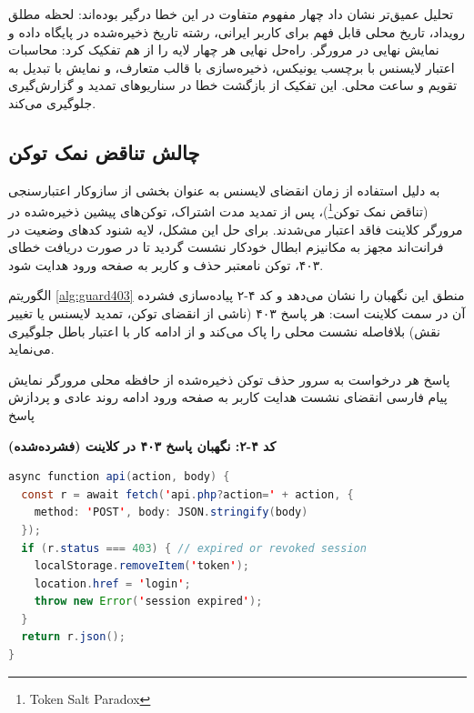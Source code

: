 \documentclass[11pt, a4paper]{report}
\newcommand{\enfootnote}[1]{\footnote{\foreignlanguage{english}{#1}}}
\begin{document}
تحلیل عمیق‌تر نشان داد چهار مفهوم متفاوت در این خطا درگیر بوده‌اند: لحظه مطلق رویداد، تاریخ محلی قابل فهم برای کاربر ایرانی، رشته تاریخ ذخیره‌شده در پایگاه داده و نمایش نهایی در مرورگر. راه‌حل نهایی هر چهار لایه را از هم تفکیک کرد: محاسبات اعتبار لایسنس با برچسب یونیکس، ذخیره‌سازی با قالب متعارف، و نمایش با تبدیل به تقویم و ساعت محلی. این تفکیک از بازگشت خطا در سناریوهای تمدید و گزارش‌گیری جلوگیری می‌کند.

\subsection{چالش تناقض نمک توکن}
به دلیل استفاده از زمان انقضای لایسنس به عنوان بخشی از سازوکار اعتبارسنجی (تناقض نمک توکن\enfootnote{Token Salt Paradox})، پس از تمدید مدت اشتراک، توکن‌های پیشین ذخیره‌شده در مرورگر کلاینت فاقد اعتبار می‌شدند. برای حل این مشکل، لایه شنود کدهای وضعیت در فرانت‌اند مجهز به مکانیزم ابطال خودکار نشست گردید تا در صورت دریافت خطای ۴۰۳، توکن نامعتبر حذف و کاربر به صفحه ورود هدایت شود.

الگوریتم \ref{alg:guard403} منطق این نگهبان را نشان می‌دهد و کد ۴-۲ پیاده‌سازی فشرده آن در سمت کلاینت است: هر پاسخ ۴۰۳ (ناشی از انقضای توکن، تمدید لایسنس یا تغییر نقش) بلافاصله نشست محلی را پاک می‌کند و از ادامه کار با اعتبار باطل جلوگیری می‌نماید.

\begin{algorithm}[htbp]
\caption{نگهبان خودکار ابطال نشست در سمت کلاینت}
\label{alg:guard403}
\begin{algorithmic}[1]
\REQUIRE پاسخ هر درخواست به سرور
\STATE حذف توکن ذخیره‌شده از حافظه محلی مرورگر
\STATE نمایش پیام فارسی انقضای نشست
\STATE هدایت کاربر به صفحه ورود
\ELSE
\STATE ادامه روند عادی و پردازش پاسخ
\ENDIF
\end{algorithmic}
\end{algorithm}

\noindent\textbf{کد ۴-۲: نگهبان پاسخ ۴۰۳ در کلاینت (فشرده‌شده)}
\begin{otherlanguage}{english}
\begin{lstlisting}[language=Java]
async function api(action, body) {
  const r = await fetch('api.php?action=' + action, {
    method: 'POST', body: JSON.stringify(body)
  });
  if (r.status === 403) { // expired or revoked session
    localStorage.removeItem('token');
    location.href = 'login';
    throw new Error('session expired');
  }
  return r.json();
}
\end{lstlisting}
\end{otherlanguage}
\end{document}
